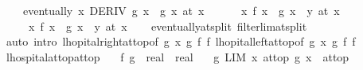 \begin{isabellebody}
\ \ \ \ eventually\ {\isacharparenleft}{\kern0pt}{\isasymlambda}x{\isachardot}{\kern0pt}\ DERIV\ g\ x\ {\isacharcolon}{\kern0pt}{\isachargreater}{\kern0pt}\ g{\isacharprime}{\kern0pt}\ x{\isacharparenright}{\kern0pt}\ {\isacharparenleft}{\kern0pt}at\ x{\isacharparenright}{\kern0pt}\ {\isasymLongrightarrow}\isanewline
\ \ \ \ {\isacharparenleft}{\kern0pt}{\isacharparenleft}{\kern0pt}{\isasymlambda}\ x{\isachardot}{\kern0pt}\ {\isacharparenleft}{\kern0pt}f{\isacharprime}{\kern0pt}\ x\ {\isacharslash}{\kern0pt}\ g{\isacharprime}{\kern0pt}\ x{\isacharparenright}{\kern0pt}{\isacharparenright}{\kern0pt}\ {\isasymlonglongrightarrow}\ y{\isacharparenright}{\kern0pt}\ {\isacharparenleft}{\kern0pt}at\ x{\isacharparenright}{\kern0pt}\ {\isasymLongrightarrow}\isanewline
\ \ \ \ {\isacharparenleft}{\kern0pt}{\isacharparenleft}{\kern0pt}{\isasymlambda}\ x{\isachardot}{\kern0pt}\ f\ x\ {\isacharslash}{\kern0pt}\ g\ x{\isacharparenright}{\kern0pt}\ {\isasymlonglongrightarrow}\ y{\isacharparenright}{\kern0pt}\ {\isacharparenleft}{\kern0pt}at\ x{\isacharparenright}{\kern0pt}{\isachardoublequoteclose}\isanewline
%
\isadelimproof
\ \ %
\endisadelimproof
%
\isatagproof
{}\isamarkupfalse%
\ eventually{\isacharunderscore}{\kern0pt}at{\isacharunderscore}{\kern0pt}split\ filterlim{\isacharunderscore}{\kern0pt}at{\isacharunderscore}{\kern0pt}split\isanewline
\ \ \isamarkupfalse%
\ {\isacharparenleft}{\kern0pt}auto\ intro{\isacharbang}{\kern0pt}{\isacharcolon}{\kern0pt}\ lhopital{\isacharunderscore}{\kern0pt}right{\isacharunderscore}{\kern0pt}at{\isacharunderscore}{\kern0pt}top{\isacharbrackleft}{\kern0pt}of\ g\ x\ g{\isacharprime}{\kern0pt}\ f\ f{\isacharprime}{\kern0pt}{\isacharbrackright}{\kern0pt}\ lhopital{\isacharunderscore}{\kern0pt}left{\isacharunderscore}{\kern0pt}at{\isacharunderscore}{\kern0pt}top{\isacharbrackleft}{\kern0pt}of\ g\ x\ g{\isacharprime}{\kern0pt}\ f\ f{\isacharprime}{\kern0pt}{\isacharbrackright}{\kern0pt}{\isacharparenright}{\kern0pt}%
\endisatagproof
{\isafoldproof}%
%
\isadelimproof
\isanewline
%
\endisadelimproof
\isanewline
{}\isamarkupfalse%
\ lhospital{\isacharunderscore}{\kern0pt}at{\isacharunderscore}{\kern0pt}top{\isacharunderscore}{\kern0pt}at{\isacharunderscore}{\kern0pt}top{\isacharcolon}{\kern0pt}\isanewline
\ \ \ f\ g\ {\isacharcolon}{\kern0pt}{\isacharcolon}{\kern0pt}\ {\isachardoublequoteopen}real\ {\isasymRightarrow}\ real{\isachardoublequoteclose}\isanewline
\ \ \ g{\isacharunderscore}{\kern0pt}{}{\isacharcolon}{\kern0pt}\ {\isachardoublequoteopen}LIM\ x\ at{\isacharunderscore}{\kern0pt}top{\isachardot}{\kern0pt}\ g\ x\ {\isacharcolon}{\kern0pt}{\isachargreater}{\kern0pt}\ at{\isacharunderscore}{\kern0pt}top{\isachardoublequoteclose}\isanewline

\end{isabellebody}
